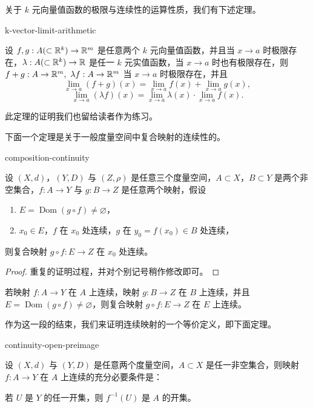 关于 $k$ 元向量值函数的极限与连续性的运算性质，我们有下述定理。

\begin{mythm}{}{k-vector-limit-arithmetic}

设 $f,g:A(\subset\mathbb{R}^k)\to\mathbb{R}^m$ 是任意两个 $k$ 元向量值函数，并且当 $x\to a$ 时极限存在，$\lambda:A(\subset\mathbb{R}^k)\to\mathbb{R}$ 是任一 $k$ 元实值函数，当 $x\to a$ 时也有极限存在，则 $f+g:A\to\mathbb{R}^m,\ \lambda f:A\to\mathbb{R}^m$ 当 $x\to a$ 时极限存在，并且
\[\lim_{x\to a}(f+g)(x)=\lim_{x\to a}f(x)+\lim_{x\to a}g(x),\]
\[\lim_{x\to a}(\lambda f)(x)=\lim_{x\to a}\lambda(x)\cdot\lim_{x\to a}f(x).\]

\end{mythm}

此定理的证明我们也留给读者作为练习。

下面一个定理是关于一般度量空间中复合映射的连续性的。

\begin{mythm}{}{composition-continuity}

设 $(X,d)$，$(Y,D)$ 与 $(Z,\rho)$ 是任意三个度量空间，$A\subset X$，$B\subset Y$ 是两个非空集合，$f:A\to Y$ 与 $g:B\to Z$ 是任意两个映射，假设

\begin{enumerate}[label=\arabic{enumi})]
\item $E=\operatorname{Dom}(g\circ f)\neq\varnothing$，
\item $x_0\in E$，$f$ 在 $x_0$ 处连续，$g$ 在 $y_0=f(x_0)\in B$ 处连续，
\end{enumerate}

则复合映射 $g\circ f:E\to Z$ 在 $x_0$ 处连续。

\end{mythm}

\begin{proof}

重复的证明过程，并对个别记号稍作修改即可。

\end{proof}

\begin{mycor*}{}

若映射 $f:A\to Y$ 在 $A$ 上连续，映射 $g:B\to Z$ 在 $B$ 上连续，并且 $E=\operatorname{Dom}(g\circ f)\neq\varnothing$，则复合映射 $g\circ f:E\to Z$ 在 $E$ 上连续。

\end{mycor*}

作为这一段的结束，我们来证明连续映射的一个等价定义，即下面定理。

\begin{mythm}{}{continuity-open-preimage}

设 $(X,d)$ 与 $(Y,D)$ 是任意两个度量空间，$A\subset X$ 是任一非空集合，则映射 $f:A\to Y$ 在 $A$ 上连续的充分必要条件是：

若 $U$ 是 $Y$ 的任一开集，则 $f^{-1}(U)$ 是 $A$ 的开集。

\end{mythm}

